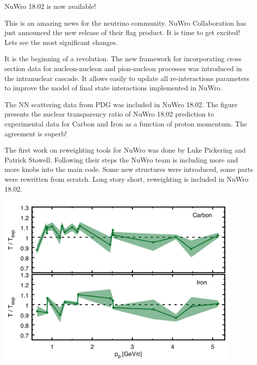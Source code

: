 \documentclass{article}
\date{FEBRUARY 26, 2018}
\begin{document}
\maketitle

\begin{center}
  {\vspace{25pt}\sc\huge NuWro 18.02 is now available!\vspace{25pt}}
\end{center}

\begin{minipage}{0.29\textwidth}

This is an amazing news for the neutrino community. NuWro Collaboration has just announced the new release of their flag product. It is time to get excited! Lets see the most significant changes. 


It is the beginning of a revolution. The new framework for incorporating cross section data for nucleon-nucleon and pion-nucleon processes was introduced in the intranuclear cascade. It allows easily to update all re-interactions parameters to improve the model of final state interactions implemented in NuWro.

The NN scattering data from PDG was included in NuWro 18.02. The figure presents the nuclear transparency ratio of NuWro 18.02 prediction to experimental data for Carbon and Iron as a function of proton momentum. The agreement is superb!


The first work on reweighting tools for NuWro was done by Luke Pickering and Patrick Stowell. Following their steps the NuWro team is including more and more knobs into the main code. Some new structures were introduced, some parts were rewritten from scratch. Long story short, reweighting is included in NuWro 18.02. 

\end{minipage}\hspace{0.5cm}\begin{minipage}{0.71\textwidth}

\vspace{20pt}

\includegraphics[width=0.9\textwidth]{img/1802_transparency.png}


\end{minipage}
\end{document}
